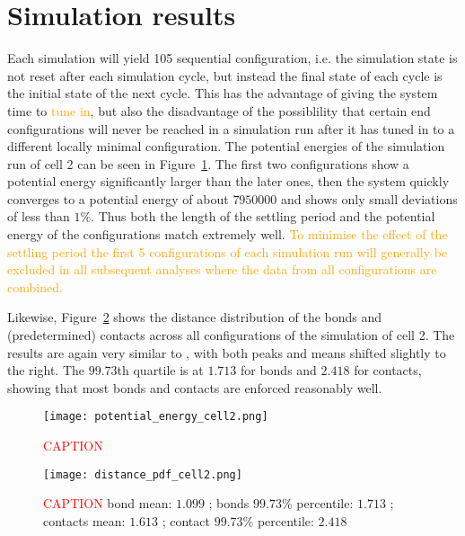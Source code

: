 
\section{Simulation results} %
\label{sec:simulation_results}

Each simulation will yield 105 sequential configuration, i.e. the simulation state is not reset after each simulation cycle, but instead the final state of each cycle is the initial state of the next cycle. This has the advantage of giving the system time to \textcolor{orange}{tune in}, but also the disadvantage of the possiblility that certain end configurations will never be reached in a simulation run after it has tuned in to a different locally minimal configuration. The potential energies of the simulation run of cell 2 can be seen in Figure~\ref{img:potential_energy_cell2}. The first two configurations show a potential energy significantly larger than the later ones, then the system quickly converges to a potential energy of about \(\num{7950000}\) and shows only small deviations of less than \(1 \%\). Thus both the length of the settling period and the potential energy of the configurations match \cite{wettermann_minimal_2020} extremely well. \textcolor{orange}{To minimise the effect of the settling period the first 5 configurations of each simulation run will generally be excluded in all subsequent analyses where the data from all configurations are combined.}

Likewise, Figure~\ref{img:distance_pdf_cell2} shows the distance distribution of the bonds and (predetermined) contacts across all configurations of the simulation of cell 2. The results are again very similar to \cite{wettermann_minimal_2020}, with both peaks and means shifted slightly to the right. The \(99.73\)th quartile is at \(1.713\) for bonds and \(2.418\) for contacts, showing that most bonds and contacts are enforced reasonably well.

\begin{figure}[ht]
\centering
  \texttt{[image: potential\_energy\_cell2.png]}
  \caption{\textcolor{red}{CAPTION}}
  \label{img:potential_energy_cell2}
\end{figure}

\begin{figure}[ht]
\centering
  \texttt{[image: distance\_pdf\_cell2.png]}
  \caption{\textcolor{red}{CAPTION} bond mean: \(\num{1.099}\) ; bonds \(99.73\%\) percentile: \(1.713\) ; contacts mean: \(\num{1.613}\) ; contact \(99.73\%\) percentile: \(2.418\)}
  \label{img:distance_pdf_cell2}
\end{figure}


